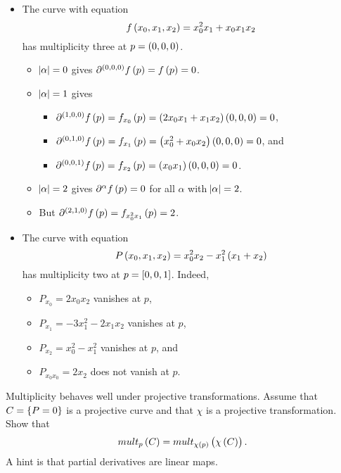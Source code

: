 \pagebreak

\begin{example}
\hfill
\begin{itemize}
\item The curve with equation
$$ f\br{x_0, x_1, x_2} = x_0^2x_1 + x_0x_1x_2 $$
has multiplicity three at $ p = \br{0, 0, 0} $.
\begin{itemize}
\item $ \abs{\alpha} = 0 $ gives $ \partial^{\br{0, 0, 0}} f\br{p} = f\br{p} = 0 $.
\item $ \abs{\alpha} = 1 $ gives
\begin{itemize}
\item $ \partial^{\br{1, 0, 0}} f\br{p} = f_{x_0}\br{p} = \br{2x_0x_1 + x_1x_2}\br{0, 0, 0} = 0 $,
\item $ \partial^{\br{0, 1, 0}} f\br{p} = f_{x_1}\br{p} = \br{x_0^2 + x_0x_2}\br{0, 0, 0} = 0 $, and
\item $ \partial^{\br{0, 0, 1}} f\br{p} = f_{x_2}\br{p} = \br{x_0x_1}\br{0, 0, 0} = 0 $.
\end{itemize}
\item $ \abs{\alpha} = 2 $ gives $ \partial^\alpha f\br{p} = 0 $ for all $ \alpha $ with $ \abs{\alpha} = 2 $.
\item But $ \partial^{\br{2, 1, 0}} f\br{p} = f_{x_0^2x_1}\br{p} = 2 $.
\end{itemize}
\item The curve with equation
$$ P\br{x_0, x_1, x_2} = x_0^2x_2 - x_1^2\br{x_1 + x_2} $$
has multiplicity two at $ p = \sbr{0, 0, 1} $. Indeed,
\begin{itemize}
\item $ P_{x_0} = 2x_0x_2 $ vanishes at $ p $,
\item $ P_{x_1} = -3x_1^2 - 2x_1x_2 $ vanishes at $ p $,
\item $ P_{x_2} = x_0^2 - x_1^2 $ vanishes at $ p $, and
\item $ P_{x_0x_0} = 2x_2 $ does not vanish at $ p $.
\end{itemize}
\end{itemize}
\end{example}

\begin{exercise}
\label{ex:32}
Multiplicity behaves well under projective transformations. Assume that $ C = \cbr{P = 0} $ is a projective curve and that $ \chi $ is a projective transformation. Show that
$$ mult_p\br{C} = mult_{\chi\br{p}}\br{\chi\br{C}}. $$
A hint is that partial derivatives are linear maps.
\end{exercise}

